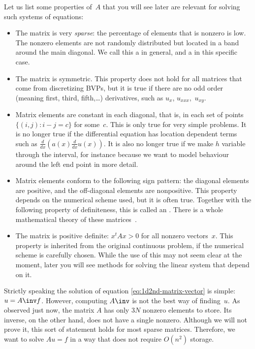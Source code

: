 Let us
list some properties of~$A$ that you will see later
are relevant for solving such systems
of equations:
\begin{itemize}
\item The matrix is very \emph{sparse}: the
  percentage of elements that is nonzero is low. The nonzero elements
  are not randomly distributed but located in a band around the main
  diagonal. We call this a  in general, and a
   in this specific case.
\item The matrix is symmetric. This property does not hold for all
  matrices that come from discretizing \ac{BVP}s, but it is true if
  there are no odd order (meaning first, third, fifth,\ldots)
  derivatives, such as $u_x$, $u_{xxx}$,~$u_{xy}$.
\item Matrix elements are constant in each diagonal, that is, in each
  set of points $\{(i,j)\colon i-j=c\}$ for some~$c$. This is only
  true for very simple problems. It is no longer true if the
  differential equation has location dependent terms such as $\frac
  d{dx}(a(x)\frac d{dx}u(x))$. It is also no longer true if we make
  $h$ variable through the interval, for instance because we want to
  model behaviour around the left end point in more detail.
\item Matrix elements conform to the following sign pattern: the
  diagonal elements are positive, and the off-diagonal elements are
  nonpositive. This property depends on the numerical scheme used, but
  it is often true. Together with the following property of
  definiteness, this is called an . There is a
  whole mathematical theory of these matrices~\cite{BePl:book}.
\item The matrix is positive definite: $x^tAx>0$ for all nonzero
  vectors~$x$. This property is inherited from the original continuous
  problem, if the numerical scheme is carefully chosen. While the use
  of this may not seem clear at the moment, later you will see methods
  for solving the linear system that depend on it.
\end{itemize}

Strictly speaking the solution of equation
\eqref{eq:1d2nd-matrix-vector} is simple: $u=A\inv f$. However, 
computing $A\inv$
is not the best way of finding~$u$. As observed just now, the matrix
$A$ has only $3N$ nonzero elements to store. Its inverse, on the other
hand, does not have a single nonzero. Although we will not prove it,
this sort of statement holds for most sparse matrices. Therefore, we
want to solve $Au=f$ in a way that does not require $O(n^2)$ storage.

